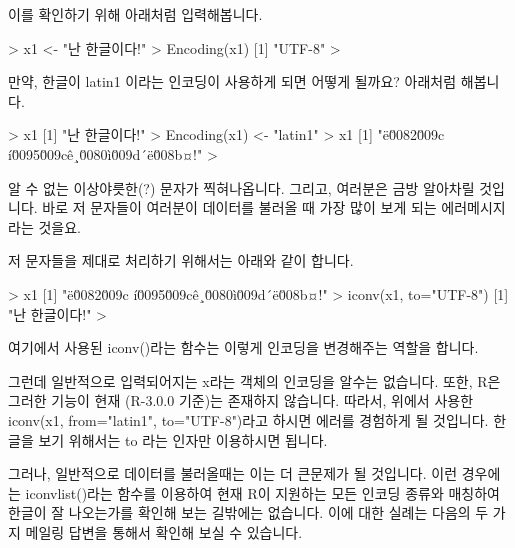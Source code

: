 이를 확인하기 위해 아래처럼 입력해봅니다.
%
%

\begin{Schunk}
\begin{Soutput}
> x1 <- "난 한글이다!"
> Encoding(x1)
[1] "UTF-8"
> 
\end{Soutput}
\end{Schunk}

만약, 한글이 latin1 이라는 인코딩이 사용하게 되면 어떻게 될까요? 
아래처럼 해봅니다.

\begin{Schunk}
\begin{Soutput}
> x1
[1] "난 한글이다!"
> Encoding(x1) <- "latin1"
> x1
[1] "ë\u0082\u009c í\u0095\u009cê¸\u0080ì\u009d´ë\u008b¤!"
> 
\end{Soutput}
\end{Schunk}

알 수 없는 이상야릇한(?) 문자가 찍혀나옵니다. 
그리고, 여러분은 금방 알아차릴 것입니다.
바로 저 문자들이 여러분이 데이터를 불러올 때 가장 많이 보게 되는 에러메시지라는 것을요.

저 문자들을 제대로 처리하기 위해서는 아래와 같이 합니다. 
\begin{Schunk}
\begin{Soutput}
> x1
[1] "ë\u0082\u009c í\u0095\u009cê¸\u0080ì\u009d´ë\u008b¤!"
> iconv(x1, to="UTF-8")
[1] "난 한글이다!"
> 
\end{Soutput}
\end{Schunk}

여기에서 사용된 iconv()라는 함수는 이렇게 인코딩을 변경해주는 역할을 합니다. 

그런데 일반적으로 입력되어지는 x라는 객체의 인코딩을 알수는 없습니다.
또한, R은 그러한 기능이 현재 (R-3.0.0 기준)는 존재하지 않습니다.
따라서, 위에서 사용한 iconv(x1, from="latin1", to="UTF-8")라고 하시면 에러를 경험하게 될 것입니다.
한글을 보기 위해서는 to 라는 인자만 이용하시면 됩니다.

그러나, 일반적으로 데이터를 불러올때는 이는 더 큰문제가 될 것입니다.
이런 경우에는 iconvlist()라는 함수를 이용하여 현재 R이 지원하는 모든 인코딩 종류와 매칭하여 한글이 잘 나오는가를 확인해 보는 길밖에는 없습니다.
이에 대한 실례는 다음의 두 가지 메일링 답변을 통해서 확인해 보실 수 있습니다. 

